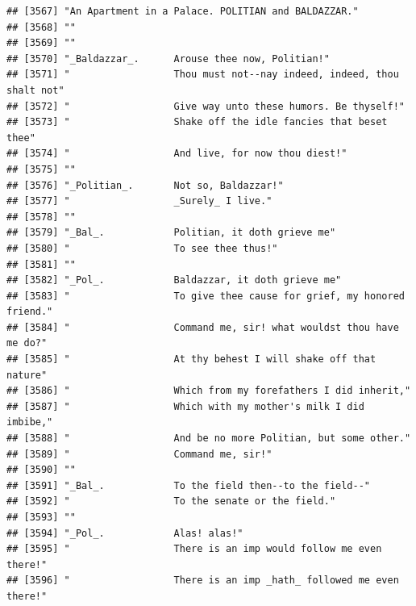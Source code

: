 \documentclass{article}\usepackage[]{graphicx}\usepackage[]{color}
\makeatletter
\newenvironment{kframe}{%
 \def\at@end@of@kframe{}%
 \ifinner\ifhmode%
  \def\at@end@of@kframe{\end{minipage}}%
  \begin{minipage}{\columnwidth}%
 \fi\fi%
 \def\FrameCommand##1{\hskip\@totalleftmargin \hskip-\fboxsep
 \colorbox{shadecolor}{##1}\hskip-\fboxsep
     \hskip-\linewidth \hskip-\@totalleftmargin \hskip\columnwidth}%
 \MakeFramed {\advance\hsize-\width
   \@totalleftmargin\z@ \linewidth\hsize
   \@setminipage}}%
 {\par\unskip\endMakeFramed%
 \at@end@of@kframe}
\newenvironment{knitrout}{}{} %
\makeatother
\begin{document}
\begin{knitrout}
\begin{kframe}
\begin{verbatim}
## [3567] "An Apartment in a Palace. POLITIAN and BALDAZZAR."                           
## [3568] ""                                                                            
## [3569] ""                                                                            
## [3570] "_Baldazzar_.      Arouse thee now, Politian!"                                
## [3571] "                  Thou must not--nay indeed, indeed, thou shalt not"         
## [3572] "                  Give way unto these humors. Be thyself!"                   
## [3573] "                  Shake off the idle fancies that beset thee"                
## [3574] "                  And live, for now thou diest!"                             
## [3575] ""                                                                            
## [3576] "_Politian_.       Not so, Baldazzar!"                                        
## [3577] "                  _Surely_ I live."                                          
## [3578] ""                                                                            
## [3579] "_Bal_.            Politian, it doth grieve me"                               
## [3580] "                  To see thee thus!"                                         
## [3581] ""                                                                            
## [3582] "_Pol_.            Baldazzar, it doth grieve me"                              
## [3583] "                  To give thee cause for grief, my honored friend."          
## [3584] "                  Command me, sir! what wouldst thou have me do?"            
## [3585] "                  At thy behest I will shake off that nature"                
## [3586] "                  Which from my forefathers I did inherit,"                  
## [3587] "                  Which with my mother's milk I did imbibe,"                 
## [3588] "                  And be no more Politian, but some other."                  
## [3589] "                  Command me, sir!"                                          
## [3590] ""                                                                            
## [3591] "_Bal_.            To the field then--to the field--"                         
## [3592] "                  To the senate or the field."                               
## [3593] ""                                                                            
## [3594] "_Pol_.            Alas! alas!"                                               
## [3595] "                  There is an imp would follow me even there!"               
## [3596] "                  There is an imp _hath_ followed me even there!"            

\end{verbatim}
\end{kframe}
\end{knitrout}
\end{document}
